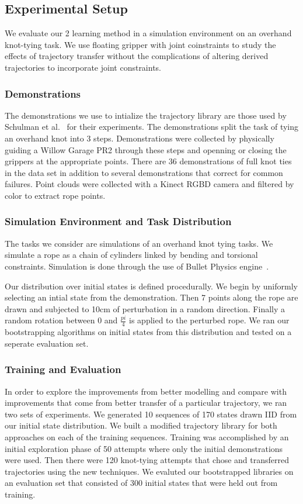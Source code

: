 \subsection{Experimental Setup}
We evaluate our 2 learning method in a simulation environment on an overhand knot-tying task.
We use floating gripper with joint coinstraints to study the effects of trajectory transfer
without the complications of altering derived trajectories to incorporate joint constraints.

\subsubsection{Demonstrations}
The demonstrations we use to intialize the trajectory library are those used by
Schulman et al.~\cite{Schulmanetal_ISRR2013} for their experiments. The demonstrations
split the task of tying an overhand knot into 3 steps. Demonstrations were collected
by physically guiding a Willow Garage PR2 through these steps and openning or closing 
the grippers at the appropriate points. There are 36 demonstrations of full knot ties
in the data set in addition to several demonstrations that correct for common failures.
Point clouds were collected with a Kinect RGBD camera and filtered by color to extract
rope points. 

\subsubsection{Simulation Environment and Task Distribution} 
The tasks we consider are simulations of an overhand knot tying tasks. 
We simulate a rope as a chain of cylinders linked by bending and torsional constraints.
Simulation is done through the use of Bullet Physics engine~\cite{Bullet_Physics}.

Our distribution over initial states is defined procedurally. We begin by uniformly
selecting an intial state from the demonstration. Then 7 points along the rope are 
drawn and subjected to 10cm of perturbation in a random direction. Finally a random
rotation between 0 and $\frac{pi}{4}$ is applied to the perturbed rope. We ran our
bootstrapping algorithms on initial states from this distribution and tested on a 
seperate evaluation set.

\subsubsection{Training and Evaluation}
In order to explore the improvements from better modelling and compare with improvements
that come from better transfer of a particular trajectory, we ran two sets of experiments.
We generated 10 sequences of 170 states drawn IID from our initial state distribution.
We built a modified trajectory library for both approaches on each of the training sequences.
Training was accomplished by an initial exploration phase of 50 attempts where only the initial
demonstrations were used. Then there were 120 knot-tying attempts that chose and transferred
trajectories using the new techniques. We evaluted our bootstrapped libraries on an evaluation
set that consisted of 300 initial states that were held out from training.
